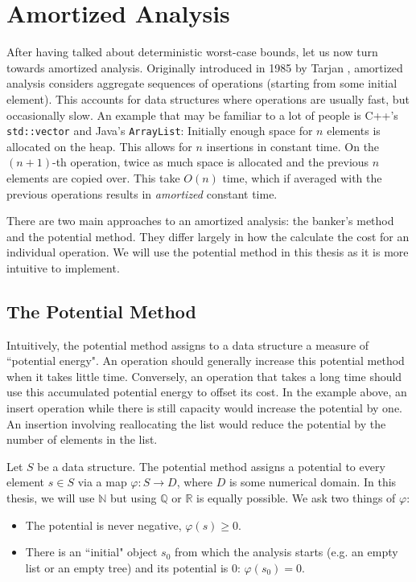 
\chapter{Amortized Analysis}
\label{ch:amortized-analysis}
After having talked about deterministic worst-case bounds, let us now turn towards amortized analysis. Originally introduced in 1985 by Tarjan \cite{tarjan:1985:amortizedcc}, amortized analysis considers aggregate sequences of operations (starting from some initial element). This accounts for data structures where operations are usually fast, but occasionally slow. An example that may be familiar to a lot of people is C++'s \texttt{std::vector} and Java's \texttt{ArrayList}: Initially enough space for $n$ elements is allocated on the heap. This allows for $n$ insertions in constant time. On the $(n+1)$-th operation, twice as much space is allocated and the previous $n$ elements are copied over. This take $O(n)$ time, which if averaged with the previous operations results in \emph{amortized} constant time.

There are two main approaches to an amortized analysis: the banker's method and the potential method. They differ largely in how the calculate the cost for an individual operation. We will use the potential method in this thesis as it is more intuitive to implement.

\section{The Potential Method}
Intuitively, the potential method assigns to a data structure a measure of  ``potential energy". An operation should generally increase this potential method when it takes little time. Conversely, an operation that takes a long time should use this accumulated potential energy to offset its cost. In the example above, an insert operation while there is still capacity would increase the potential by one. An insertion involving reallocating the list would reduce the potential by the number of elements in the list.

Let $S$ be a data structure. The potential method assigns a potential to every element $s \in S$ via a map $\varphi : S \rightarrow D$, where $D$ is some numerical domain. In this thesis, we will use $\mathbb N$ but using $\mathbb Q$ or $\mathbb R$ is equally possible. We ask two things of $\varphi$:

\newpage
\begin{itemize}
    \item The potential is never negative, $\varphi(s) \geq 0$.
    \item There is an ``initial" object $s_0$ from which the analysis starts (e.g. an empty list or an empty tree) and its potential is 0: $\varphi(s_0) = 0$.
\end{itemize}

